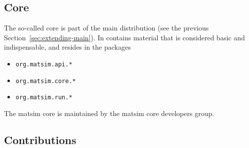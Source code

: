 \subsection{Core}
\label{sec:extending-core}

The so-called core is part of the main distribution (see the previous Section~\ref{sec:extending-main}).  In contains material that is considered basic and indispensable, and resides in the
packages
\begin{itemize}\styleItemize
\item \lstinline{org.matsim.api.*}
\item \lstinline{org.matsim.core.*}
\item \lstinline{org.matsim.run.*}
\end{itemize}
%
The \gls{matsim} core is maintained by the \gls{matsim} core developers group.

 


\subsection{Contributions}

